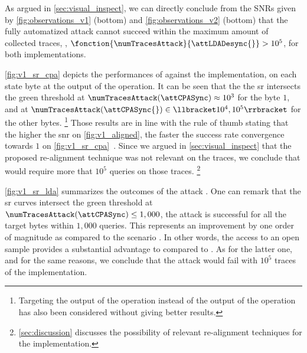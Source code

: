 As argued in \autoref{sec:visual_inspect}, we can directly conclude from the SNRs given by \autoref{fig:observations_v1} (bottom) and \autoref{fig:observations_v2} (bottom) that the fully automatized attack \attLDADesync{} cannot succeed within the maximum amount of collected traces, \ie{}, \(\fonction{\numTracesAttack}{\attLDADesync{}} > 10^5\), for both implementations.

\autoref{fig:v1_sr_cpa} depicts the performances of \attCPASync{} against the \mbedTLS{} implementation, on each state byte at the output of the \sub{} operation.
It can be seen that the the \gls{sr} intersects the green threshold at \(\numTracesAttack(\attCPASync) \approx 10^3\)
for the byte \(1\), and at \(\numTracesAttack(\attCPASync{}) \in \llbracket 10^4, 10^5 \rrbracket\) for the other bytes.%
\footnote{
	Targeting the output of the \ark{} operation instead of the output of the \sub{} operation has also been considered without giving better results.
}
Those results are in line with the rule of thumb stating that the higher the \gls{snr} on \autoref{fig:v1_aligned}, the faster the success rate convergence towards \(1\) on \autoref{fig:v1_sr_cpa}~\cite{mangard_power_2007}.
Since we argued in \autoref{sec:visual_inspect} that the proposed re-alignment technique was not relevant on the \aeshuitbit{} traces, we conclude that \attCPASync{} would require more that \(10^5\) queries on those traces.%
\footnote{
	\autoref{sec:discussion} discusses the possibility of relevant re-alignment techniques for the \aeshuitbit{} implementation.
}

\autoref{fig:v1_sr_lda} summarizes the outcomes of the attack \attLDASync{}.
One can remark that the \gls{sr} curves intersect the green threshold at \(\numTracesAttack(\attCPASync) \leq 1,000\), \ie{} the attack is successful for all the target bytes within \(1,000\) queries.
This represents an improvement by one order of magnitude as compared to the scenario \attCPASync{}.
In other words, the access to an open sample provides a substantial advantage to \attLDASync{} compared to \attCPASync{}.
As for the latter one, and for the same reasons, we conclude that the attack \attLDASync{} would fail with \(10^5\) traces of the \aeshuitbit{} implementation.

